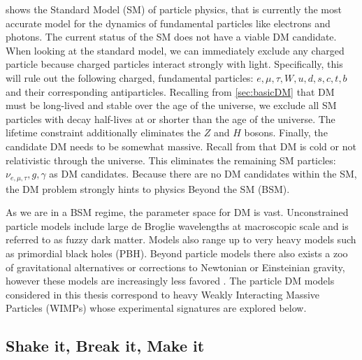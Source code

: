  shows the Standard Model (SM) of particle physics, that is currently the most accurate model for the dynamics of fundamental particles like electrons and photons.
The current status of the SM does not have a viable DM candidate.
When looking at the standard model, we can immediately exclude any charged particle because charged particles interact strongly with light.
Specifically, this will rule out the following charged, fundamental particles: $e,\mu, \tau, W, u, d, s, c, t, b$ and their corresponding antiparticles.
Recalling from \cref{sec:basicDM} that DM must be long-lived and stable over the age of the universe, we exclude all SM particles with decay half-lives at or shorter than the age of the universe.
The lifetime constraint additionally eliminates the $Z$ and $H$ bosons.
Finally, the candidate DM needs to be somewhat massive.
Recall from  that DM is cold or not relativistic through the universe.
This eliminates the remaining SM particles: $\nu_{e, \mu, \tau}, g, \gamma$ as DM candidates.
Because there are no DM candidates within the SM, the DM problem strongly hints to physics Beyond the SM (BSM).

As we are in a BSM regime, the parameter space for DM is vast.
Unconstrained particle models include large de Broglie wavelengths at macroscopic scale and is referred to as fuzzy dark matter.
Models also range up to very heavy models such as primordial black holes (PBH).
Beyond particle models there also exists a zoo of gravitational alternatives or corrections to Newtonian or Einsteinian gravity, however these models are increasingly less favored \cite{dm_PDGID}.
The particle DM models considered in this thesis correspond to heavy Weakly Interacting Massive Particles (WIMPs) whose experimental signatures are explored below.

\subsection{Shake it, Break it, Make it\label{sec:bop_it}}


